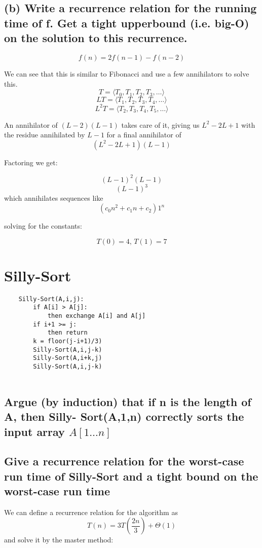 \documentclass[titlepage]{article}\usepackage[]{graphicx}\usepackage[]{color}
\begin{document}
\subsection{(b) Write a recurrence relation for the running time of f. Get a tight
upperbound (i.e. big-O) on the solution to this recurrence.}

\[ f(n) = 2f(n-1) - f(n-2)  \]

We can see that this is similar to Fibonacci and use a few annihilators to
solve this.
\[ T = \langle T_0, T_1, T_2, T_3, \ldots \rangle \]
\[ LT = \langle T_1, T_2, T_3, T_4, \ldots \rangle \]
\[ L^2T = \langle T_2, T_3, T_4, T_5, \ldots \rangle \]



An annihilator of $(L - 2)(L-1)$ takes care of it, giving us  
$ L^2 - 2L + 1 $ with the residue annihilated by $L-1$ for a final annihilator
of
\[ (L^2 - 2L + 1)(L-1) \]

Factoring we get:

\[ (L-1)^2(L-1) \]
\[ (L-1)^3 \]
which annihilates sequences like 
\[ \left(c_0n^2 + c_1 n + c_2 \right) 1^n \]

solving for the constants:

\[ T(0) = 4, \, T(1) = 7 \]


\section{Silly-Sort }
\begin{lstlisting}
	Silly-Sort(A,i,j):
		if A[i] > A[j]:
			then exchange A[i] and A[j]
		if i+1 >= j:
			then return
		k = floor(j-i+1)/3)
		Silly-Sort(A,i,j-k)
		Silly-Sort(A,i+k,j)
		Silly-Sort(A,i,j-k)
	
\end{lstlisting}



\subsection{ Argue (by induction) that if n is the
length of A, then Silly- Sort(A,1,n)
correctly sorts the input array
$A[1\dots n]$}


\subsection{ Give a recurrence relation for the worst-case run time of Silly-Sort and a
tight bound on the worst-case run time}

We can define a recurrence relation for the algorithm as 
\[ T(n) = 3T(\frac{2n}{3}) + \Theta(1) \]
and solve it by the master method:
\end{document}
